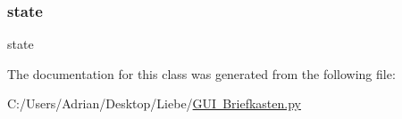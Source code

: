 \subsubsection{\texorpdfstring{state}{state}}
{\footnotesize\ttfamily state}



The documentation for this class was generated from the following file\+:\begin{DoxyCompactItemize}
\item 
C\+:/\+Users/\+Adrian/\+Desktop/\+Liebe/\mbox{\hyperlink{_g_u_i_01_briefkasten_8py}{G\+U\+I Briefkasten.\+py}}\end{DoxyCompactItemize}
